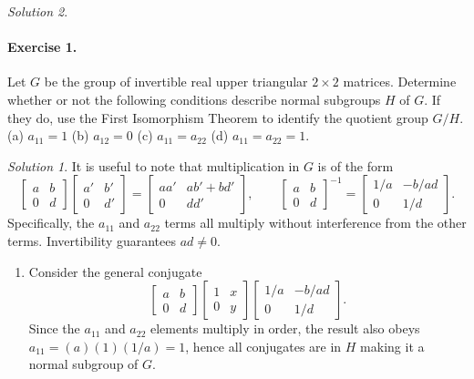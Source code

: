 \documentclass[11pt]{report}
\theoremstyle{remark}
\newtheorem*{solution}{Solution}
\begin{document}
\begin{solution}
    \paragraph{Exercise 1.} Let $G$ be the group of invertible real upper triangular
    $2 \times 2$ matrices. Determine whether or not the following conditions describe
    normal subgroups $H$ of $G$. If they do, use the First Isomorphism Theorem to
    identify the quotient group $G/H$. \\
    (a) $a_{11} = 1$ (b) $a_{12} = 0$ (c) $a_{11} = a_{22}$ (d) $a_{11} = a_{22} =
    1$.
    \begin{solution}
        It is useful to note that multiplication in $G$ is of the form \[
            \begin{bmatrix}
                a & b \\ 0 & d
            \end{bmatrix} \begin{bmatrix}
                a' & b' \\ 0 & d'
            \end{bmatrix} = \begin{bmatrix}
                aa' & ab' + bd' \\ 0 & dd'
            \end{bmatrix}, \qquad
            \begin{bmatrix}
                a & b \\ 0 & d
            \end{bmatrix}^{-1} = \begin{bmatrix}
                1 / a & -b / ad \\ 0 & 1 / d
            \end{bmatrix}.
        \] Specifically, the $a_{11}$ and $a_{22}$ terms all multiply without
        interference from the other terms. Invertibility guarantees $ad \neq 0$.
        \begin{enumerate}
            \item Consider the general conjugate \[
                \begin{bmatrix}
                    a & b \\ 0 & d
                \end{bmatrix} \begin{bmatrix}
                    1 & x \\ 0 & y
                \end{bmatrix} \begin{bmatrix}
                    1 / a & -b / ad \\ 0 & 1 / d
                \end{bmatrix}.
            \] Since the $a_{11}$ and $a_{22}$ elements multiply in order, the result
            also obeys $a_{11} = (a)(1)(1 / a) = 1$, hence all conjugates are in $H$
            making it a normal subgroup of $G$.


\end{enumerate}
\end{solution}
\end{solution}
\end{document}
